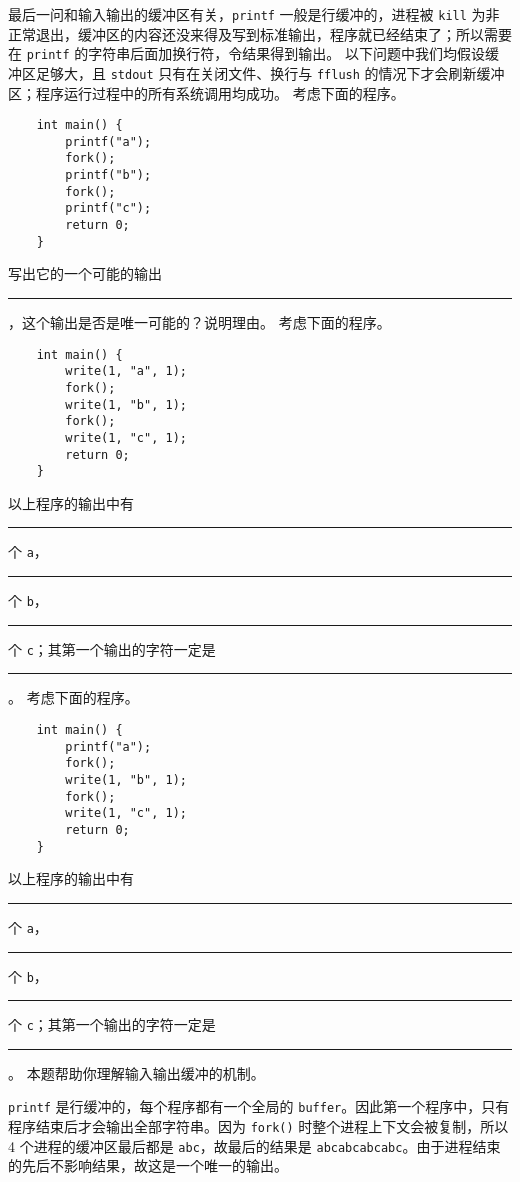 \begin{problems}
        最后一问和输入输出的缓冲区有关，\verb|printf| 一般是行缓冲的，进程被 \verb|kill| 为非正常退出，缓冲区的内容还没来得及写到标准输出，程序就已经结束了；所以需要在 \verb|printf| 的字符串后面加换行符，令结果得到输出。
        \pro 以下问题中我们均假设缓冲区足够大，且 \verb|stdout| 只有在关闭文件、换行与 \verb|fflush| 的情况下才会刷新缓冲区；程序运行过程中的所有系统调用均成功。
        \qn 考虑下面的程序。
        \begin{verbatim}
    int main() {
        printf("a");
        fork();
        printf("b");
        fork();
        printf("c");
        return 0;
    }
        \end{verbatim}
        写出它的一个可能的输出 \rule{3.5cm}{0.25mm}，这个输出是否是唯一可能的？说明理由。
        \qn 考虑下面的程序。
        \begin{verbatim}
    int main() {
        write(1, "a", 1);
        fork();
        write(1, "b", 1);
        fork();
        write(1, "c", 1);
        return 0;
    }
        \end{verbatim}
        以上程序的输出中有 \rule{1cm}{0.25mm} 个 \verb|a|，\rule{1cm}{0.25mm} 个 \verb|b|，\rule{1cm}{0.25mm} 个 \verb|c|；其第一个输出的字符一定是 \rule{1cm}{0.25mm}。
        \qn 考虑下面的程序。
        \begin{verbatim}
    int main() {
        printf("a");
        fork();
        write(1, "b", 1);
        fork();
        write(1, "c", 1);
        return 0;
    }
        \end{verbatim}
        以上程序的输出中有 \rule{1cm}{0.25mm} 个 \verb|a|，\rule{1cm}{0.25mm} 个 \verb|b|，\rule{1cm}{0.25mm} 个 \verb|c|；其第一个输出的字符一定是 \rule{1cm}{0.25mm}。
        \sol 本题帮助你理解输入输出缓冲的机制。

        \verb|printf| 是行缓冲的，每个程序都有一个全局的 \verb|buffer|。因此第一个程序中，只有程序结束后才会输出全部字符串。因为 \verb|fork()| 时整个进程上下文会被复制，所以 4 个进程的缓冲区最后都是 \verb|abc|，故最后的结果是 \verb|abcabcabcabc|。由于进程结束的先后不影响结果，故这是一个唯一的输出。


\end{problems}
